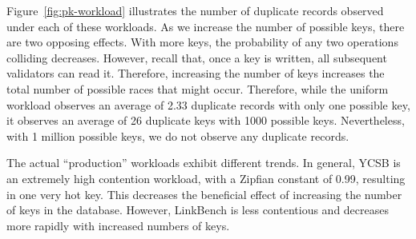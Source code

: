 Figure~\ref{fig:pk-workload} illustrates the number of duplicate
records observed under each of these workloads. As we increase the
number of possible keys, there are two opposing effects. With
more keys, the probability of any two operations colliding
decreases. However, recall that, once a key is written, all subsequent
validators can read it. Therefore, increasing the number of keys
increases the total number of possible races that might
occur. Therefore, while the uniform workload observes an average of
2.33 duplicate records with only one possible key, it observes an average of 26
duplicate keys with 1000 possible keys. Nevertheless, with 1 million possible
keys, we do not observe any duplicate records.

The actual ``production'' workloads exhibit different trends. In
general, YCSB is an extremely high contention workload, with a Zipfian
constant of 0.99, resulting in one very hot key. This decreases the
beneficial effect of increasing the number of keys in the
database. However, LinkBench is less contentious and decreases more
rapidly with increased numbers of keys.

